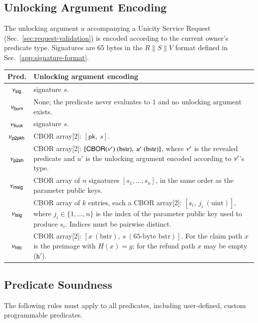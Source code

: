 \subsection{Unlocking Argument Encoding}

The unlocking argument $u$ accompanying a Unicity Service Request (Sec.~\ref{sec:request-validation}) is encoded according to the current owner's predicate type. Signatures are 65 bytes in the $R\|S\|V$ format defined in Sec.~\ref{app:signature-format}.

\begin{longtable}{cp{10cm}}
\textbf{Pred.} & \textbf{Unlocking argument encoding} \\
\hline
\endhead
$\nu_\mathsf{sig}$    & signature $s$. \\
$\nu_\mathsf{burn}$   & None; the predicate never evaluates to $1$ and no unlocking argument exists. \\
$\nu_\mathsf{tlock}$  & signature $s$. \\
$\nu_\mathsf{p2pkh}$  & CBOR array[2]: $[\mathsf{pk},\ s]$. \\
$\nu_\mathsf{p2sh}$   & CBOR array[2]: $[\mathsf{CBOR}(\predi')\ (\text{bstr}),\ u'\ (\text{bstr})]$, where $\nu'$ is the revealed predicate and $u'$ is the unlocking argument encoded according to $\nu'$'s type. \\
$\nu_\mathsf{msig}$   & CBOR array of $n$ signatures $[s_1, \ldots, s_n]$, in the same order as the parameter public keys. \\
$\nu_\mathsf{tsig}$   & CBOR array of $k$ entries, each a CBOR array[2]: $[s_i,\ j_i\ (\text{uint})]$, where $j_i \in \{1,\ldots,n\}$ is the index of the parameter public key used to produce $s_i$. Indices must be pairwise distinct. \\
$\nu_\mathsf{htlc}$   & CBOR array[2]: $[x\ (\text{bstr}),\ s\ (65\text{-byte bstr})]$. For the claim path $x$ is the preimage with $H(x) = y$; for the refund path $x$ may be empty ($\mathtt{h'}$). \\
\end{longtable}


\subsection{Predicate Soundness}\label{app:predicate-soundness}

The following rules must apply to all predicates, including user-defined, custom programmable predicates.


